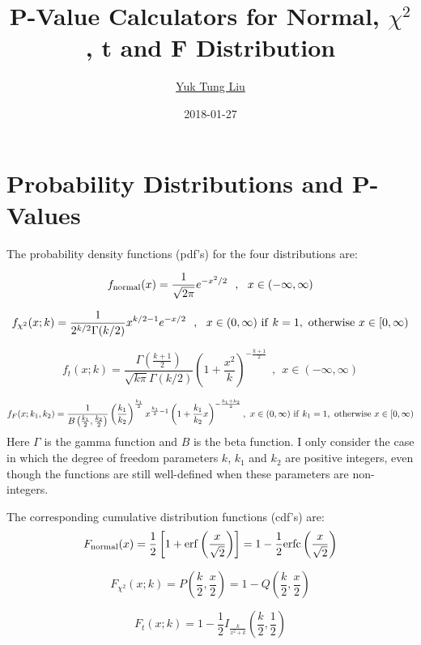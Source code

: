 \documentclass[12pt]{article}
\newcommand \beq {\begin{equation}}
\newcommand \eeq {\end{equation}}
\begin{document}
\title{P-Value Calculators for Normal, $\chi^2$, t and F Distribution}
\author{\href{https://publish.illinois.edu/ytliu/}{Yuk Tung Liu}}
\date{2018-01-27}
\maketitle

\section{Probability Distributions and P-Values}

The probability density functions (pdf's) for the four distributions are:

\beq
  f_{\rm normal}(x) = \frac{1}{\sqrt{2\pi}} e^{-x^2/2} \ \ , \ \  
x \in (-\infty,\infty) 
\label{eq:f_normal}
\eeq

\beq
  f_{\chi^2}(x; k) = \frac{1}{2^{k/2} \Gamma(k/2)} x^{k/2-1} e^{-x/2} \ \ , \ \ 
x \in (0,\infty)~{\rm if}~k=1,~{\rm otherwise}~x \in [0,\infty) 
\label{eq:f_chi2}
\eeq

\beq
  f_t(x;k) = \frac{\Gamma \left(\frac{k+1}{2}\right)}{\sqrt{k\pi} \Gamma(k/2)} 
\left( 1+\frac{x^2}{k}\right)^{-\frac{k+1}{2}} \ \ , \ \ x \in (-\infty,\infty) 
\label{eq:f_t}
\eeq

\beq
  f_F(x; k_1,k_2) = \frac{1}{B\left(\frac{k_1}{2},\frac{k_2}{2}\right)} 
\left( \frac{k_1}{k_2}\right)^{\frac{k_1}{2}} x^{\frac{k_1}{2}-1} 
\left(1+\frac{k_1}{k_2}x\right)^{-\frac{k_1+k_2}{2}} , \  
x \in (0,\infty)~{\rm if}~k_1=1,~{\rm otherwise}~x \in [0,\infty)
\label{eq:f_F}
\eeq
Here $\Gamma$ is the gamma function and $B$ is the beta function. 
I only consider the case in which 
the degree of freedom parameters $k$, $k_1$ and $k_2$ are positive integers, 
even though the functions are still well-defined when these parameters are 
non-integers.

The corresponding cumulative distribution functions (cdf's) are:
\beq
   F_{\rm normal}(x) = \frac{1}{2} \left[ 1+{\rm erf}\left(\frac{x}{\sqrt{2}}\right) 
\right] = 1-\frac{1}{2}{\rm erfc}\left(\frac{x}{\sqrt{2}}\right) 
\label{eq:F_normal} 
\eeq

\beq
  F_{\chi^2}(x;k) = P\left(\frac{k}{2},\frac{x}{2}\right) = 
1-Q\left(\frac{k}{2},\frac{x}{2}\right)
\label{eq:F_chi2}
\eeq

\beq
 F_t(x;k) = 1-\frac{1}{2}I_{\frac{k}{x^2+k}}\left( \frac{k}{2},\frac{1}{2}\right) 
\label{eq:F_t}
\eeq
\end{document}

